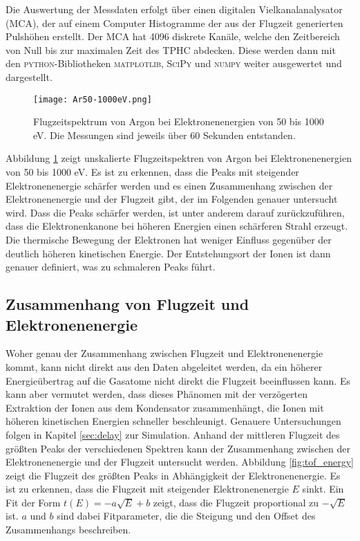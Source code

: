 Die Auswertung der Messdaten erfolgt über einen digitalen Vielkanalanalysator (MCA), der auf einem Computer Histogramme der aus der Flugzeit generierten Pulshöhen erstellt. Der MCA hat 4096 diskrete Kanäle, welche den Zeitbereich von Null bis zur maximalen Zeit des TPHC abdecken. Diese werden dann mit den \textsc{python}-Bibliotheken \textsc{matplotlib}, \textsc{SciPy} und \textsc{numpy} weiter ausgewertet und dargestellt. 
\begin{figure}
    \hspace{-1.1cm}\texttt{[image: Ar50-1000eV.png]}
    \caption[Flugzeitspektrum von Argon bei Elektronenenergien von 50 bis 1000 eV]{Flugzeitspektrum von Argon bei Elektronenenergien von 50 bis 1000 eV. Die Messungen sind jeweils über 60 Sekunden entstanden.}
    \label{fig:ar}
\end{figure}
Abbildung \ref{fig:ar} zeigt unskalierte Flugzeitspektren von Argon bei Elektronenenergien von 50 bis 1000 eV. Es ist zu erkennen, dass die Peaks mit steigender Elektronenenergie schärfer werden und es einen Zusammenhang zwischen der Elektronenenergie und der Flugzeit gibt, der im Folgenden genauer untersucht wird. Dass die Peaks schärfer werden, ist unter anderem darauf zurückzuführen, dass die Elektronenkanone bei höheren Energien einen schärferen Strahl erzeugt. Die thermische Bewegung der Elektronen hat weniger Einfluss gegenüber der deutlich höheren kinetischen Energie. Der Entstehungsort der Ionen ist dann genauer definiert, was zu schmaleren Peaks führt.

\subsection{Zusammenhang von Flugzeit und Elektronenenergie}
Woher genau der Zusammenhang zwischen Flugzeit und Elektronenenergie kommt, kann nicht direkt aus den Daten abgeleitet werden, da ein höherer Energieübertrag auf die Gasatome nicht direkt die Flugzeit beeinflussen kann. Es kann aber vermutet werden, dass dieses Phänomen mit der verzögerten Extraktion der Ionen aus dem Kondensator zusammenhängt, die Ionen mit höheren kinetischen Energien schneller beschleunigt. Genauere Untersuchungen folgen in Kapitel \ref{sec:delay} zur Simulation. Anhand der mittleren Flugzeit des größten Peaks der verschiedenen Spektren kann der Zusammenhang zwischen der Elektronenenergie und der Flugzeit untersucht werden.
Abbildung \ref{fig:tof_energy} zeigt die Flugzeit des größten Peaks in Abhängigkeit der Elektronenenergie. Es ist zu erkennen, dass die Flugzeit mit steigender Elektronenenergie $E$ sinkt. Ein Fit der Form $t(E) = -a\sqrt{E} + b$ zeigt, dass die Flugzeit proportional zu $-\sqrt{E}$ ist. $a$ und $b$ sind dabei Fitparameter, die die Steigung und den Offset des Zusammenhangs beschreiben. 

